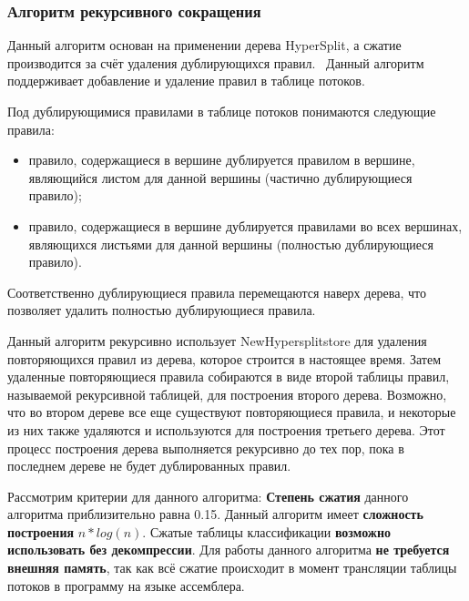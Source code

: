 \documentclass[oneside,final,12pt]{extarticle}
\begin{document}
        \subsubsection{Алгоритм рекурсивного сокращения}
            Данный алгоритм основан на применении дерева HyperSplit, а сжатие производится за счёт удаления дублирующихся правил.~\cite{chang2019fast}
            Данный алгоритм поддерживает добавление и удаление правил в таблице потоков.

            Под дублирующимися правилами в таблице потоков понимаются следующие правила:
            \begin{itemize}
                \item правило, содержащиеся в вершине дублируется правилом в вершине, являющийся листом для данной вершины (частично дублирующиеся правило);
                \item правило, содержащиеся в вершине дублируется правилами во всех вершинах, являющихся листьями для данной вершины (полностью дублирующиеся правило).
            \end{itemize}
            Соответственно дублирующиеся правила перемещаются наверх дерева, что позволяет удалить полностью дублирующиеся правила.
            
            Данный алгоритм рекурсивно использует NewHypersplitstore для удаления повторяющихся правил из дерева, которое строится в настоящее время. 
            Затем удаленные повторяющиеся правила собираются в виде второй таблицы правил, называемой рекурсивной таблицей, для построения второго дерева. 
            Возможно, что во втором дереве  все еще существуют повторяющиеся правила, и некоторые из них также удаляются и используются для построения третьего дерева. 
            Этот процесс построения дерева выполняется рекурсивно до тех пор, пока в последнем дереве не будет дублированных правил. 

            Рассмотрим критерии для данного алгоритма: \textbf{Степень сжатия} данного алгоритма приблизительно равна 0.15.
            Данный алгоритм имеет \textbf{сложность построения} \(n*log(n)\). Сжатые таблицы классификации \textbf{возможно использовать без декомпрессии}.
            Для работы данного алгоритма \textbf{не требуется внешняя память}, так как всё сжатие происходит в момент трансляции таблицы потоков в
            программу на языке ассемблера.
\end{document}
